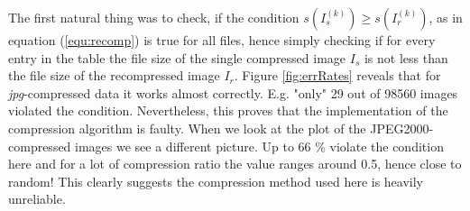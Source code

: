 \documentclass[10pt,twocolumn,letterpaper]{article}
\begin{document}
The first natural thing was to check, if the condition $s(I_s^{(k)}) \geq s(I_r^{(k)})$, as in equation (\ref{equ:recomp}) is true for all files, hence simply checking if for every entry in the table the file size of the single compressed image $I_s$ is not less than the file size of the recompressed image $I_r$. Figure \ref{fig:errRates} reveals that for \emph{jpg}-compressed data it works almost correctly. E.g. "only" 29 out of 98560 images violated the condition. Nevertheless, this proves that the implementation of the compression algorithm is faulty. When we look at the plot of the JPEG2000-compressed images we see a different picture. Up to 66 \% violate the condition here and for a lot of compression ratio the value ranges around 0.5, hence close to random! This clearly suggests the compression method used here is heavily unreliable.
\end{document}

